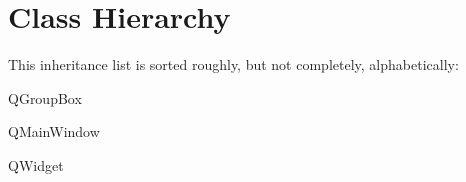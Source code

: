 \section{Class Hierarchy}
This inheritance list is sorted roughly, but not completely, alphabetically\-:\begin{DoxyCompactList}
\item {}
\begin{DoxyCompactList}
\item {}
\item {}
\end{DoxyCompactList}
\item Q\-Group\-Box\begin{DoxyCompactList}
\item {}
\begin{DoxyCompactList}
\item {}
\end{DoxyCompactList}
\end{DoxyCompactList}
\item Q\-Main\-Window\begin{DoxyCompactList}
\item {}
\end{DoxyCompactList}
\item Q\-Widget\begin{DoxyCompactList}
\item {}
\end{DoxyCompactList}
\end{DoxyCompactList}
